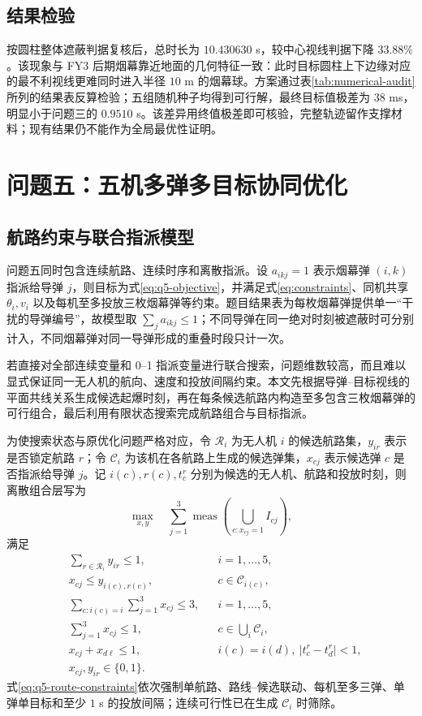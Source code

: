\documentclass[UTF8,a4paper,12pt,fontset=windows]{ctexart}
\newcommand{\meas}{\operatorname{meas}}
\begin{document}
\subsection{结果检验}

按圆柱整体遮蔽判据复核后，总时长为 $10.430630$ s，较中心视线判据下降 $33.88\%$。该现象与 FY3 后期烟幕靠近地面的几何特征一致：此时目标圆柱上下边缘对应的最不利视线更难同时进入半径 $10$ m 的烟幕球。方案通过表\ref{tab:numerical-audit}所列的结果表反算检验；五组随机种子均得到可行解，最终目标值极差为 $38$ ms，明显小于问题三的 $0.9510$ s。该差异用终值极差即可核验，完整轨迹留作支撑材料；现有结果仍不能作为全局最优性证明。

\section{问题五：五机多弹多目标协同优化}

\subsection{航路约束与联合指派模型}

问题五同时包含连续航路、连续时序和离散指派。设 $a_{ikj}=1$ 表示烟幕弹 $(i,k)$ 指派给导弹 $j$，则目标为式\eqref{eq:q5-objective}，并满足式\eqref{eq:constraints}、同机共享 $\theta_i,v_i$ 以及每机至多投放三枚烟幕弹等约束。题目结果表为每枚烟幕弹提供单一“干扰的导弹编号”，故模型取 $\sum_j a_{ikj}\leq1$；不同导弹在同一绝对时刻被遮蔽时可分别计入，不同烟幕弹对同一导弹形成的重叠时段只计一次。

若直接对全部连续变量和 0--1 指派变量进行联合搜索，问题维数较高，而且难以显式保证同一无人机的航向、速度和投放间隔约束。本文先根据导弹--目标视线的平面共线关系生成候选起爆时刻，再在每条候选航路内构造至多包含三枚烟幕弹的可行组合，最后利用有限状态搜索完成航路组合与目标指派。

为使搜索状态与原优化问题严格对应，令 $\mathcal R_i$ 为无人机 $i$ 的候选航路集，$y_{ir}$ 表示是否锁定航路 $r$；令 $\mathcal C_i$ 为该机在各航路上生成的候选弹集，$x_{cj}$ 表示候选弹 $c$ 是否指派给导弹 $j$。记 $i(c),r(c),t_c^r$ 分别为候选的无人机、航路和投放时刻，则离散组合层写为
\begin{equation}
\max_{x,y}\quad
\sum_{j=1}^{3}
\meas\!\left(\bigcup_{c:x_{cj}=1}I_{cj}\right),
\label{eq:q5-route-model}
\end{equation}
满足
\begin{equation}
\begin{aligned}
&\sum_{r\in\mathcal R_i}y_{ir}\leq1,
&&i=1,\ldots,5,\\
&x_{cj}\leq y_{i(c),r(c)},
&&c\in\mathcal C_{i(c)},\\
&\sum_{c:i(c)=i}\sum_{j=1}^{3}x_{cj}\leq3,
&&i=1,\ldots,5,\\
&\sum_{j=1}^{3}x_{cj}\leq1,
&&c\in\bigcup_i\mathcal C_i,\\
&x_{cj}+x_{d\ell}\leq1,
&&i(c)=i(d),\ |t_c^r-t_d^r|<1,\\
&x_{cj},y_{ir}\in\{0,1\}.&&
\end{aligned}
\label{eq:q5-route-constraints}
\end{equation}
式\eqref{eq:q5-route-constraints}依次强制单航路、路线--候选联动、每机至多三弹、单弹单目标和至少 $1$ s 的投放间隔；连续可行性已在生成 $\mathcal C_i$ 时筛除。
\end{document}
